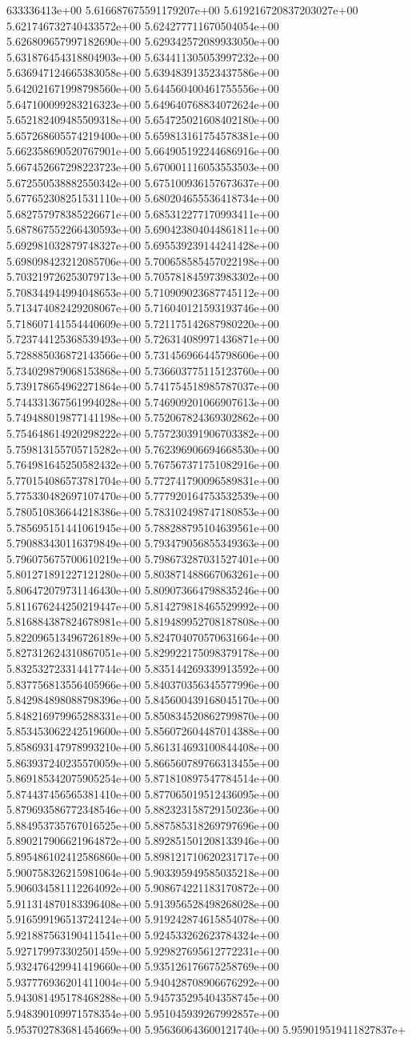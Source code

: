 633336413e+00	5.616687675591179207e+00	5.619216720837203027e+00	5.621746732740433572e+00	5.624277711670504054e+00	5.626809657997182690e+00	5.629342572089933050e+00	5.631876454318804903e+00	5.634411305053997232e+00	5.636947124665383058e+00	5.639483913523437586e+00	5.642021671998798560e+00	5.644560400461755556e+00	5.647100099283216323e+00	5.649640768834072624e+00	5.652182409485509318e+00	5.654725021608402180e+00	5.657268605574219400e+00	5.659813161754578381e+00	5.662358690520767901e+00	5.664905192244686916e+00	5.667452667298223723e+00	5.670001116053553503e+00	5.672550538882550342e+00	5.675100936157673637e+00	5.677652308251531110e+00	5.680204655536418734e+00	5.682757978385226671e+00	5.685312277170993411e+00	5.687867552266430593e+00	5.690423804044861811e+00	5.692981032879748327e+00	5.695539239144241428e+00	5.698098423212085706e+00	5.700658585457022198e+00	5.703219726253079713e+00	5.705781845973983302e+00	5.708344944994048653e+00	5.710909023687745112e+00	5.713474082429208067e+00	5.716040121593193746e+00	5.718607141554440609e+00	5.721175142687980220e+00	5.723744125368539493e+00	5.726314089971436871e+00	5.728885036872143566e+00	5.731456966445798606e+00	5.734029879068153868e+00	5.736603775115123760e+00	5.739178654962271864e+00	5.741754518985787037e+00	5.744331367561994028e+00	5.746909201066907613e+00	5.749488019877141198e+00	5.752067824369302862e+00	5.754648614920298222e+00	5.757230391906703382e+00	5.759813155705715282e+00	5.762396906694668530e+00	5.764981645250582432e+00	5.767567371751082916e+00	5.770154086573781704e+00	5.772741790096589831e+00	5.775330482697107470e+00	5.777920164753532539e+00	5.780510836644218386e+00	5.783102498747180853e+00	5.785695151441061945e+00	5.788288795104639561e+00	5.790883430116379849e+00	5.793479056855349363e+00	5.796075675700610219e+00	5.798673287031527401e+00	5.801271891227121280e+00	5.803871488667063261e+00	5.806472079731146430e+00	5.809073664798835246e+00	5.811676244250219447e+00	5.814279818465529992e+00	5.816884387824678981e+00	5.819489952708187808e+00	5.822096513496726189e+00	5.824704070570631664e+00	5.827312624310867051e+00	5.829922175098379178e+00	5.832532723314417744e+00	5.835144269339913592e+00	5.837756813556405966e+00	5.840370356345577996e+00	5.842984898088798396e+00	5.845600439168045170e+00	5.848216979965288331e+00	5.850834520862799870e+00	5.853453062242519600e+00	5.856072604487014388e+00	5.858693147978993210e+00	5.861314693100844408e+00	5.863937240235570059e+00	5.866560789766313455e+00	5.869185342075905254e+00	5.871810897547784514e+00	5.874437456565381410e+00	5.877065019512436095e+00	5.879693586772348546e+00	5.882323158729150236e+00	5.884953735767016525e+00	5.887585318269797696e+00	5.890217906621964872e+00	5.892851501208133946e+00	5.895486102412586860e+00	5.898121710620231717e+00	5.900758326215981064e+00	5.903395949585035218e+00	5.906034581112264092e+00	5.908674221183170872e+00	5.911314870183396408e+00	5.913956528498268028e+00	5.916599196513724124e+00	5.919242874615854078e+00	5.921887563190411541e+00	5.924533262623784324e+00	5.927179973302501459e+00	5.929827695612772231e+00	5.932476429941419660e+00	5.935126176675258769e+00	5.937776936201411004e+00	5.940428708906676292e+00	5.943081495178468288e+00	5.945735295404358745e+00	5.948390109971578354e+00	5.951045939267992857e+00	5.953702783681454669e+00	5.956360643600121740e+00	5.959019519411827837e+